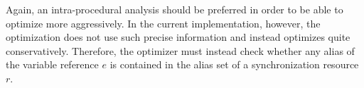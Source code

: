 Again, an intra-procedural analysis should be preferred in order to be able to optimize more aggressively. In the current implementation, however, the optimization does not use such precise information and instead optimizes quite conservatively. Therefore, the optimizer must instead check whether any alias of the variable reference $e$ is contained in the alias set of a synchronization resource $r$.



